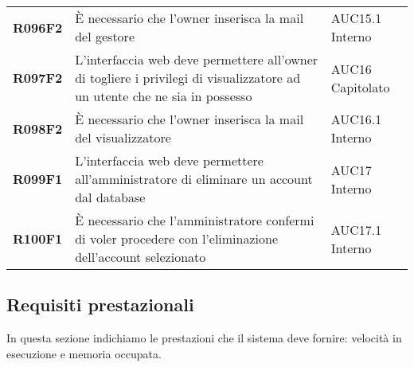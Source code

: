 \documentclass[../analisi-dei-requisiti.tex]{subfiles}
\begin{document}
\begin{longtable}[H]{>{\centering\bfseries}m{3cm} >{\centering}m{10cm} >{\centering\arraybackslash}m{3cm}}
  R096F2                               & È necessario che l'owner inserisca la mail del gestore                                                                                                                                                  & AUC15.1 Interno               \\
  R097F2                               & L'interfaccia web deve permettere all'owner di togliere i privilegi di visualizzatore ad un utente che ne sia in possesso                                                                               & AUC16 Capitolato              \\
  R098F2                               & È necessario che l'owner inserisca la mail del visualizzatore                                                                                                                                           & AUC16.1 Interno               \\
  R099F1                               & L'interfaccia web deve permettere all'amministratore di eliminare un account dal database                                                                                                               & AUC17 Interno                 \\
  R100F1                               & È necessario che l'amministratore confermi di voler procedere con l'eliminazione dell'account selezionato                                                                                               & AUC17.1 Interno               \\
\end{longtable}

\newpage
\subsection{Requisiti prestazionali}%
\label{sub:requisiti_prestazionali}
In questa sezione indichiamo le prestazioni che il sistema deve fornire: velocità in esecuzione e memoria occupata.
\end{document}
